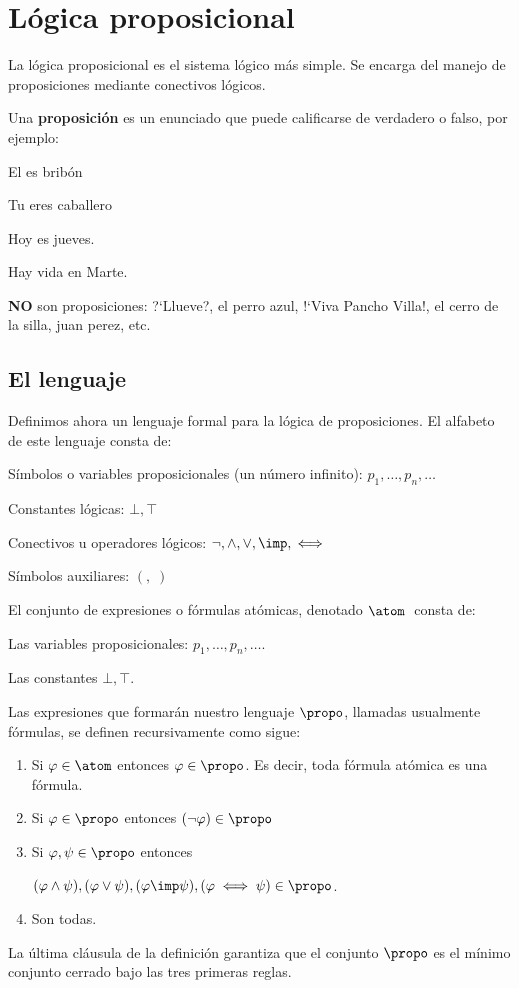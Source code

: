 \documentclass[11pt,letterpaper]{article}
\begin{document}
\section{Lógica proposicional}
La l\'ogica proposicional es el sistema lógico más simple. Se encarga del 
manejo de proposiciones mediante conectivos lógicos.
 
Una \textbf{proposición} es un enunciado que puede calificarse de verdadero o 
falso, por ejemplo:
\bi
 \item El es bribón
 \item Tu eres caballero
 \item Hoy es jueves.
 \item Hay vida en Marte.
\ei
 
\textbf{NO} son proposiciones: ?`Llueve?, el perro azul, !`Viva Pancho Villa!, 
el cerro de la silla, juan perez, etc.


\subsection{El lenguaje \propo}
\noindent
Definimos ahora un lenguaje formal para la l\'ogica de proposiciones.
El alfabeto de este lenguaje consta de:
\bi
 \item Símbolos o variables proposicionales (un número infinito): 
  $p_1,\ldots,p_n,\ldots$
 \item Constantes l\'ogicas: $\bot,\top$
 \item Conectivos u operadores lógicos: $\neg,\land,\lor,\imp,\iff$
 \item Símbolos auxiliares: $(,\;)$
\ei

\noindent El conjunto de expresiones o fórmulas atómicas, denotado $\atom\;$ 
consta de:
\bi
\item Las variables proposicionales: $p_1,\ldots,p_n,\ldots$.
\item Las constantes $\bot,\top$.
\ei

Las expresiones que formarán nuestro lenguaje $\propo$, llamadas usualmente 
fórmulas, se definen recursivamente como sigue: 
\begin{enumerate}
 \item Si $\varphi\in\atom$ entonces $\varphi\in\propo$. 
 Es decir, toda fórmula atómica es una fórmula.
 \item Si $\varphi\in\propo$ entonces $(\neg\varphi)\in\propo$
 \item Si $\varphi,\psi\in\propo$ entonces
  
$(\varphi\land\psi),(\varphi\lor\psi),(\varphi\imp\psi),
(\varphi\iff\psi)\in\propo$.
 \item Son todas.
\end{enumerate}
La última cláusula de la definición garantiza que el conjunto $\propo$ es el
mínimo conjunto cerrado bajo las tres primeras reglas.
\end{document}
